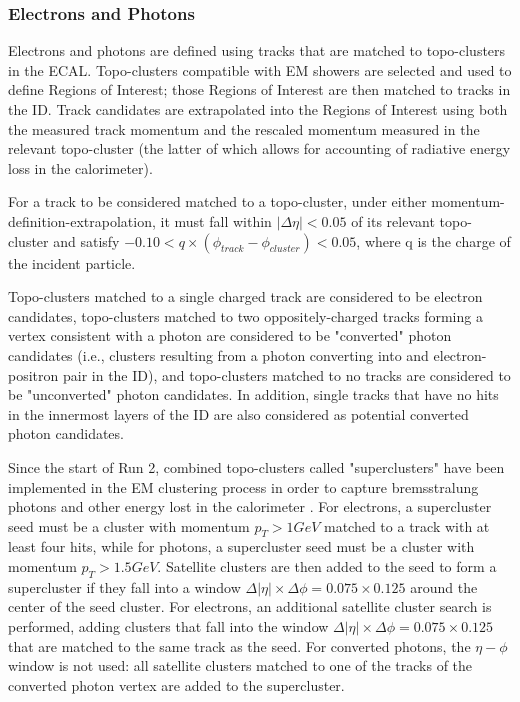 \subsubsection{Electrons and Photons} \label{sec:Electrons} 

Electrons and photons are defined using tracks that are matched to topo-clusters in the ECAL. Topo-clusters compatible with EM showers are selected and used to define Regions of Interest; those Regions of Interest are then matched to tracks in the ID. Track candidates are extrapolated into the Regions of Interest using both the measured track momentum and the rescaled momentum measured in the relevant topo-cluster (the latter of which allows for accounting of radiative energy loss in the calorimeter). 

For a track to be considered matched to a topo-cluster, under either momentum-definition-extrapolation, it must fall within $|\Delta \eta| < 0.05$ of its relevant topo-cluster and satisfy $-0.10 < q \times (\phi_{track}-\phi_{cluster}) < 0.05$, where q is the charge of the incident particle. 

Topo-clusters matched to a single charged track are considered to be electron candidates, topo-clusters matched to two oppositely-charged tracks forming a vertex consistent with a photon are considered to be "converted" photon candidates (i.e., clusters resulting from a photon converting into and electron-positron pair in the ID), and topo-clusters matched to no tracks are considered to be "unconverted" photon candidates. In addition, single tracks that have no hits in the innermost layers of the ID are also considered as potential converted photon candidates\cite{CERN-EP-2019-145}. 

Since the start of Run 2, combined topo-clusters called "superclusters" have been implemented in the EM clustering process in order to capture bremsstralung photons and other energy lost in the calorimeter \cite{ATL-PHYS-PUB-2017-022}. For electrons, a supercluster seed must be a cluster with momentum $p_{T} > 1 GeV$ matched to a track with at least four hits, while for photons, a supercluster seed must be a cluster with momentum $p_{T} > 1.5 GeV$. Satellite clusters are then added to the seed to form a supercluster if they fall into a window $\Delta |\eta| \times \Delta\phi = 0.075 \times 0.125$ around the center of the seed cluster. For electrons, an additional satellite cluster search is performed, adding clusters that fall into the window $\Delta |\eta| \times \Delta\phi = 0.075 \times 0.125$ that are matched to the same track as the seed. For converted photons, the $\eta-\phi$ window is not used: all satellite clusters matched to one of the tracks of the converted photon vertex are added to the supercluster.

